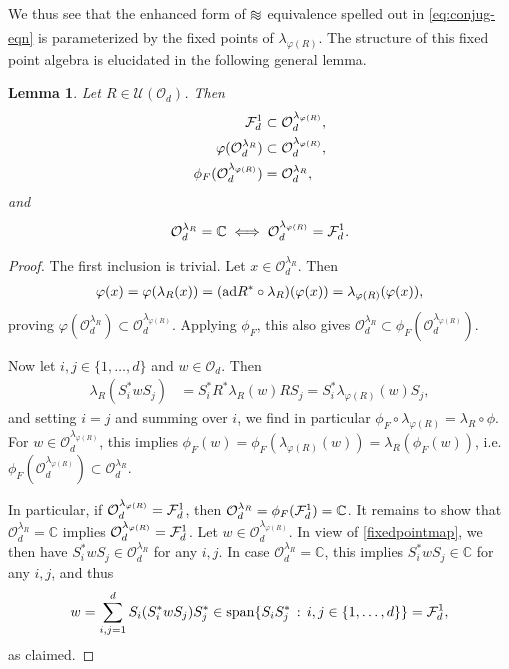 \documentclass[12pt,a4paper]{amsart}
\numberwithin{equation}{section}
\newtheorem{lemma}[theorem]{Lemma}
\theoremstyle{remark}
\def\C{\mathbb{C}}
\newcommand{\la}{\lambda}
\newcommand{\CO}[0]{\mathcal{O}} \newcommand{\CP}[0]{\mathcal{P}}
\newcommand{\CU}[0]{\mathcal{U}} \newcommand{\CV}[0]{\mathcal{V}}
\def\apeqA{\SavedStyle\sim}
\def\Msim{\setstackgap{L}{\dimexpr.5pt+1.5\LMpt}\ensurestackMath{%
  \ThisStyle{\mathrel{\Centerstack{{\apeqA} {\apeqA} {\apeqA}}}}}}
\begin{document}
We thus see that the enhanced form of $\Msim$ equivalence spelled out in \eqref{eq:conjug-eqn} is parameterized by the fixed points of $\la_{\varphi(R)}$. The structure of this fixed point algebra is elucidated in the following general lemma.

\begin{lemma}\label{lemma:fixedpointsandphi}
    Let $R\in\CU(\CO_d)$. Then
    \begin{align}
        \CF_d^1 &\subset \CO_d^{\la_{\varphi(R)}},\\
     \varphi(\CO_d^{\lambda_R}) & \subset \CO_d^{\lambda_{\varphi(R)}},
     \label{eq:fixed-point-algebra-inclusion}
     \\
     \phi_F(\CO_d^{\lambda_{\varphi(R)}}) & =\CO_d^{\lambda_R}, 
     \label{eq:fixed-point-algebra-equality}
    \end{align}
    and 
    \begin{align}\label{eq:trivial-fixed-points}
     \CO_d^{\lambda_R}=\C\;\Longleftrightarrow\;\CO_d^{\lambda_{\varphi(R)}}=\CF_d^1.
    \end{align}
\end{lemma}
\begin{proof}
 The first inclusion is trivial. Let $x\in\CO_d^{\lambda_R}$. Then 
 \begin{align*}
    \varphi(x)=\varphi(\lambda_R(x))=({\rm ad} R^*\circ\lambda_R)(\varphi(x))=\lambda_{\varphi(R)}(\varphi(x)),
 \end{align*}
 proving $\varphi(\CO_d^{\lambda_R})\subset \CO_d^{\lambda_{\varphi(R)}}$. Applying $\phi_F$, this also gives $\CO_d^{\lambda_R}\subset\phi_F(\CO_d^{\lambda_{\varphi(R)}})$. 
 
 Now let $i,j\in\{1,\ldots,d\}$ and $w\in\CO_d$. Then
 \begin{align}\label{fixedpointmap}
  \lambda_R(S_i^*wS_j)
  &=
  S_i^*R^*\lambda_R(w)RS_j
  =
  S_i^*\lambda_{\varphi(R)}(w)S_j,
 \end{align}
 and setting $i=j$ and summing over $i$, we find in particular $\phi_F\circ\lambda_{\varphi(R)}=\lambda_R\circ\phi$. For $w\in\CO_d^{\lambda_{\varphi(R)}}$, this implies $\phi_F(w)=\phi_F(\lambda_{\varphi(R)}(w))=\lambda_R(\phi_F(w))$, i.e. $\phi_F(\CO_d^{\lambda_{\varphi(R)}}) \subset \CO_d^{\lambda_R}$. 
 
 In particular, if $\CO_d^{\lambda_{\varphi(R)}}=\CF_d^1$, then $\CO_d^{\lambda_R}=\phi_F(\CF_d^1)=\C$. It remains to show that $\CO_d^{\lambda_R}=\C$ implies $\CO_d^{\lambda_{\varphi(R)}}=\CF_d^1$. Let $w\in\CO_d^{\lambda_{\varphi(R)}}$. In view of \eqref{fixedpointmap}, we then have $S_i^*wS_j\in\CO_d^{\lambda_R}$ for any $i,j$. In case $\CO_d^{\lambda_R}=\C$, this implies $S_i^*wS_j\in\C$ for any $i,j$, and thus
 \begin{align}
  w=\sum_{i,j=1}^dS_i(S_i^*wS_j)S_j^*\in{\rm span}\{S_iS_j^*\,:\,i,j\in\{1,\ldots,d\}\}=\mathcal{F}_d^1,
 \end{align}
 as claimed.
\end{proof}
\end{document}
